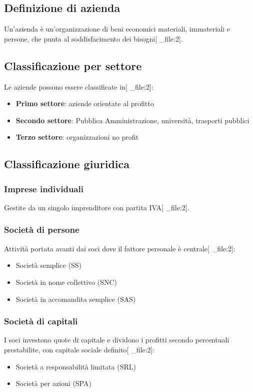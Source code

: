 \documentclass[12pt,a4paper]{article}
\begin{document}
\subsection{Definizione di azienda}
Un'azienda è un'organizzazione di beni economici materiali, immateriali e persone, che punta al soddisfacimento dei bisogni[ _file:2].

\subsection{Classificazione per settore}
Le aziende possono essere classificate in[ _file:2]:
\begin{itemize}
    \item \textbf{Primo settore}: aziende orientate al profitto
    \item \textbf{Secondo settore}: Pubblica Amministrazione, università, trasporti pubblici
    \item \textbf{Terzo settore}: organizzazioni no profit
\end{itemize}

\subsection{Classificazione giuridica}

\subsubsection{Imprese individuali}
Gestite da un singolo imprenditore con partita IVA[ _file:2].

\subsubsection{Società di persone}
Attività portata avanti dai soci dove il fattore personale è centrale[ _file:2]:
\begin{itemize}
    \item Società semplice (SS)
    \item Società in nome collettivo (SNC)
    \item Società in accomandita semplice (SAS)
\end{itemize}

\subsubsection{Società di capitali}
I soci investono quote di capitale e dividono i profitti secondo percentuali prestabilite, con capitale sociale definito[ _file:2]:
\begin{itemize}
    \item Società a responsabilità limitata (SRL)
    \item Società per azioni (SPA)
\end{itemize}
\end{document}
